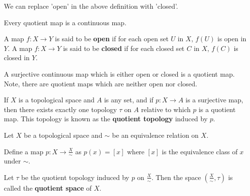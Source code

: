 \begin{note}
    We can replace 'open' in the above definition with 'closed'.
\end{note}

\begin{note}
    Every quotient map is a continuous map.
\end{note}

\begin{defn}
    A map $f: X \to Y$ is said to be \textbf{open} if for each open set $U$ in $X$, $f(U)$ is open in $Y$.
    A map $f: X \to Y$ is said to be \textbf{closed} if for each closed set $C$ in $X$, $f(C)$ is closed in $Y$.
\end{defn}


\begin{note}
    A surjective continuous map which is either open or closed is a quotient map. Note, there are quotient maps which are neither open nor closed.
\end{note}

\begin{defn}
    If $X$ is a topological space and $A$ is any set, and if $p: X \to A$ is a surjective map, then there exists exactly one topology $\tau$ on $A$ relative to which $p$ is a quotient map. This topology is known as the \textbf{quotient topology} induced by $p$.
\end{defn}

\begin{defn}
    Let $X$ be a topological space and $\sim$ be an equivalence relation on $X$. 

    Define a map $p: X \to \frac{X}{\sim}$ as $p(x) = [x]$ where $[x]$ is the equivalence class of $x$ under $\sim$.

    Let $\tau$ be the quotient topology induced by $p$ on $\frac{X}{\sim}$. Then the space $(\frac{X}{\sim}, \tau)$ is called the \textbf{quotient space} of $X$.
\end{defn}


\hhrule


